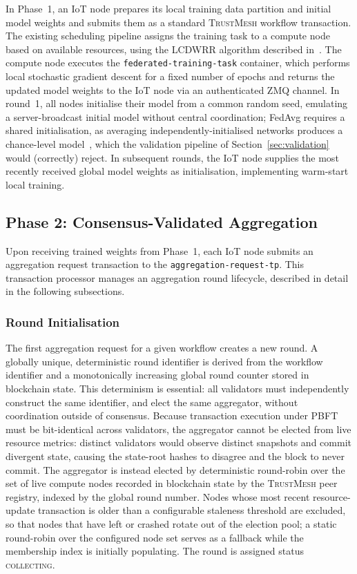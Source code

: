 \documentclass[lettersize,journal]{IEEEtran}
\newcommand{\tm}{\textsc{TrustMesh}}
\begin{document}
In Phase~1, an IoT node prepares its local training data partition and initial model weights
and submits them as a standard \tm{} workflow transaction. The existing scheduling pipeline
assigns the training task to a compute node based on available resources, using the LCDWRR
algorithm described in~\cite{rangwala2025trustmesh}. The compute node executes the
\texttt{federated-training-task} container, which performs local stochastic gradient descent
for a fixed number of epochs and returns the updated model weights to the IoT node via an
authenticated ZMQ channel. In round~1, all nodes initialise their model from a common
random seed, emulating a server-broadcast initial model without central coordination;
FedAvg requires a shared initialisation, as averaging independently-initialised networks
produces a chance-level model~\cite{mcmahan2017communication}, which the validation
pipeline of Section~\ref{sec:validation} would (correctly) reject. In subsequent rounds,
the IoT node supplies the most recently received global model weights as initialisation,
implementing warm-start local training.

\subsection{Phase 2: Consensus-Validated Aggregation}

Upon receiving trained weights from Phase~1, each IoT node submits an aggregation request
transaction to the \texttt{aggregation-request-tp}. This transaction processor manages an
aggregation round lifecycle, described in detail in the following subsections.

\subsubsection{Round Initialisation}

The first aggregation request for a given workflow creates a new round. A globally unique,
deterministic round identifier is derived from the workflow identifier and a monotonically
increasing global round counter stored in blockchain state. This determinism is essential:
all validators must independently construct the same identifier, and elect the same
aggregator, without coordination outside of consensus. Because transaction execution under
PBFT must be bit-identical across validators, the aggregator cannot be elected from live
resource metrics: distinct validators would observe distinct snapshots and commit divergent
state, causing the state-root hashes to disagree and the block to never commit. The
aggregator is instead elected by deterministic round-robin over the set of live compute
nodes recorded in blockchain state by the \tm{} peer registry, indexed by the global round
number. Nodes whose most recent resource-update transaction is older than a configurable
staleness threshold are excluded, so that nodes that have left or crashed rotate out of
the election pool; a static round-robin over the configured node set serves as a fallback
while the membership index is initially populating. The round is assigned status
\textsc{collecting}.
\end{document}
